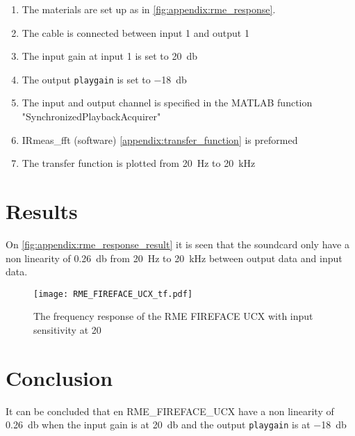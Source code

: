 \begin{enumerate}
\item The materials are set up as in \autoref{fig:appendix:rme_response}.
\item The cable is connected between input 1 and output 1
\item The input gain at input 1 is set to \SI{20}{\decibel}
\item The output \texttt{playgain} is set to \SI{-18}{\decibel}
\item The input and output channel is specified in the MATLAB function "SynchronizedPlaybackAcquirer" 
\item IRmeas_fft (software) \autoref{appendix:transfer_function} is preformed
\item The transfer function is plotted from \SI{20}{\hertz} to \SI{20}{\kilo\hertz}
\end{enumerate}

\section*{Results}



On \autoref{fig:appendix:rme_response_result} it is seen that the soundcard only have a non linearity of \SI{0.26}{\decibel} from \SI{20}{\hertz} to \SI{20}{\kilo\hertz} between output data and input data. 

\begin{figure}[H]
	\centering
	\texttt{[image: RME\_FIREFACE\_UCX\_tf.pdf]}
	\caption{The frequency response of the RME FIREFACE UCX with input sensitivity at 20}
		\label{fig:appendix:rme_response_result}
\end{figure}

\section*{Conclusion}
It can be concluded that en RME_FIREFACE_UCX have a non linearity of \SI{0.26}{\decibel} when the input gain is at \SI{20}{\decibel} and the output \texttt{playgain} is at \SI{-18}{\decibel}


